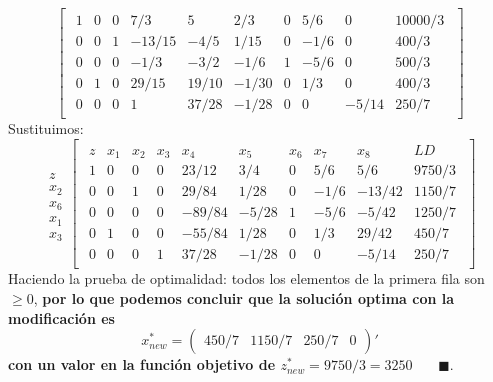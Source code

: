 \documentclass[11pt,letterpaper]{article}
\newcommand{\fin}{$\blacksquare.$}
\begin{document}
\begin{enumerate}
\begin{equation}
\begin{bmatrix}
\begin{array}{c||ccccccccc}
  1 & 0 & 0 & 7/3 & 5 & 2/3 & 0 & 5/6 &0 & 10000/3\\ 
  0 & 0 & 1 &-13/15 & -4/5 & 1/15 & 0 &-1/6 &0& 400/3  \\
  0 & 0 & 0 &-1/3 & -3/2 & -1/6 & 1 & -5/6&0& 500/3 \\
  0 & 1 & 0 & 29/15 & 19/10 & -1/30 & 0 & 1/3 &0&400/3 \\
  0 & 0 & 0 & 1 & 37/28 &-1/28& 0 & 0 & -5/14&250/7
\end{array}
\end{bmatrix}
\end{equation}
Sustituimos:
\begin{equation} 
\begin{array}{c}
\\
z \\ 
x_2 \\
x_6 \\
x_1\\
x_3
\end{array}
\begin{bmatrix}
\begin{array}{c||ccccccccc}
  z & x_1 & x_2 & x_3 & x_4 & x_5 & x_6 & x_7 & x_8 & LD\\ \hline \hline
  1 & 0 & 0 &0& 23/12 & 3/4&0&5/6&5/6 &9750/3\\ 
  0 & 0 & 1 &0& 29/84 & 1/28& 0 &-1/6 &-13/42&1150/7  \\
  0 & 0 & 0 &0&-89/84&-5/28& 1 & -5/6&-5/42&1250/7 \\
  0 & 1 & 0 &0&-55/84 & 1/28 & 0 &1/3&29/42&450/7 \\
  0 & 0 & 0 & 1 & 37/28 &-1/28& 0 & 0 & -5/14&250/7
\end{array}
\end{bmatrix}
\end{equation}
Haciendo la prueba de optimalidad: todos los elementos de la primera fila son $\geq 0$, \textbf{por lo que podemos concluir que la solución optima con la modificación es $$x_{new}^*= \begin{pmatrix}
450/7&1150/7 &250/7&0
\end{pmatrix}'$$ con un valor en la función objetivo de $z_{new}^*=9750/3=3250$} \ \ \ \fin



\end{enumerate}
\end{document}
